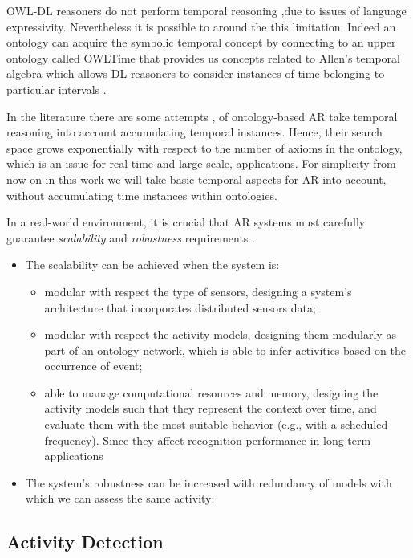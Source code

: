 \documentclass{thesisreport}
\begin{document}
  OWL-DL reasoners do not perform temporal reasoning ,due to issues of language expressivity. Nevertheless it is possible to around the this limitation. Indeed an ontology can acquire the symbolic temporal concept by connecting to an upper ontology called OWLTime that provides us concepts related to Allen’s temporal algebra which allows DL reasoners to consider instances of time belonging to particular intervals \cite{kareem2018arianna}.
  
  In the literature there are some attempts \cite{scalmato2013describing,buoncompagni2017towards}, of ontology-based AR take temporal reasoning into account accumulating temporal instances. Hence, their search space grows exponentially \cite{salguero2018using} with respect to the number of axioms in the ontology, which is an issue for real-time and large-scale,  applications. 
  For simplicity from now on in this work we will take basic temporal aspects for AR into account, without accumulating time instances within ontologies.

 
 In a real-world environment, it is crucial that AR systems must carefully guarantee \textit{scalability} and \textit{robustness} requirements \cite{kareem2018arianna}.
 \begin{itemize}
     \item The scalability can be achieved when the system is:
     \begin{itemize}
         \item modular with respect the type of sensors, designing a system’s architecture that incorporates distributed sensors data;
         \item modular with respect the activity models, designing them modularly as part of an ontology network, which is able to infer activities based on the occurrence of event;
         \item able to manage computational resources and memory, designing the activity models such that they represent the context over time, and evaluate them with the most suitable behavior (e.g., with a scheduled frequency). Since they affect recognition performance in long-term applications 
     \end{itemize}
     \item The system’s robustness can be increased with redundancy of models with which we can assess the same activity;
 \end{itemize}
 
 
 \subsection{Activity Detection}
\end{document}
